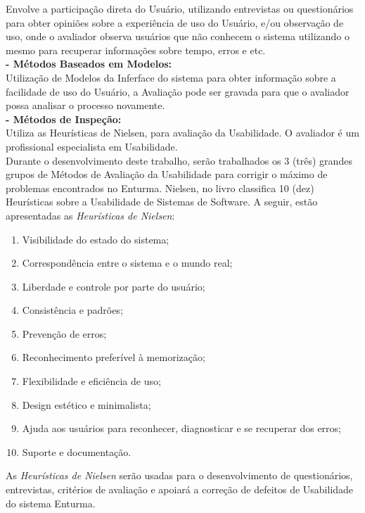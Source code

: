 	Envolve a participação direta do Usuário, utilizando entrevistas ou questionários para obter opiniões sobre a experiência de uso do Usuário, e/ou observação de uso, onde o avaliador observa usuários que não conhecem o sistema utilizando o mesmo para recuperar informações sobre tempo, erros e etc. \\

\textbf{- Métodos Baseados em Modelos:}
	\\

	Utilização de Modelos da Inferface do sistema para obter informação sobre a facilidade de uso do Usuário, a Avaliação pode ser gravada para que o avaliador possa analisar o processo novamente. \\

\textbf{- Métodos de Inspeção:}
	\\

	Utiliza as Heurísticas de Nielsen, \cite{usabilidade_interfaces} para avaliação da Usabilidade. O avaliador é um profissional especialista em Usabilidade. \\

	Durante o desenvolvimento deste trabalho, serão trabalhados os 3 (três) grandes grupos de Métodos de Avaliação da Usabilidade para corrigir o máximo de problemas encontrados no Enturma. Nielsen, no livro \cite{usabilidade_web} classifica 10 (dez) Heurísticas sobre a Usabilidade de Sistemas de Software. A seguir, estão apresentadas as \textit{Heurísticas de Nielsen}:

\begin{enumerate}
  \item Visibilidade do estado do sistema;
  \item Correspondência entre o sistema e o mundo real;
  \item Liberdade e controle por parte do usuário;
  \item Consistência e padrões;
  \item Prevenção de erros;
  \item Reconhecimento preferível à memorização;
  \item Flexibilidade e eficiência de uso;
  \item Design estético e minimalista;
  \item Ajuda aos usuários para reconhecer, diagnosticar e se recuperar dos erros;
  \item Suporte e documentação.
\end{enumerate}

	As \textit{Heurísticas de Nielsen} serão usadas para o desenvolvimento de questionários, entrevistas, critérios de avaliação e apoiará a correção de defeitos de Usabilidade do sistema Enturma.

